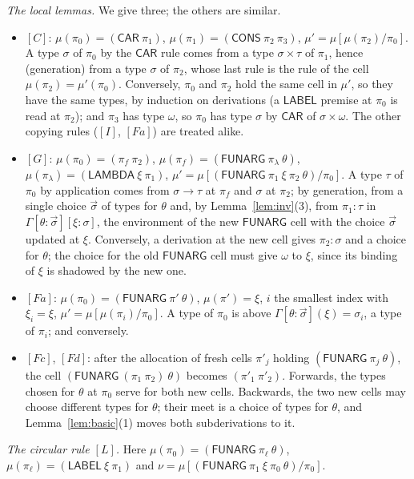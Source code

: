 \documentclass[11pt]{amsart}
\theoremstyle{definition}
\theoremstyle{remark}
\newcommand{\kw}[1]{\mathsf{#1}}
\begin{document}
\noindent\emph{The local lemmas.} We give three; the others are similar.
\begin{itemize}
\item $[C]$: $\mu(\pi_0)=(\kw{CAR}\ \pi_1)$, $\mu(\pi_1)=(\kw{CONS}\ \pi_2\ \pi_3)$,
$\mu'=\mu[\mu(\pi_2)/\pi_0]$. A type $\sigma$ of $\pi_0$ by the $\kw{CAR}$ rule
comes from a type $\sigma\times\tau$ of $\pi_1$, hence (generation) from a type
$\sigma$ of $\pi_2$, whose last rule is the rule of the cell $\mu(\pi_2)=\mu'(\pi_0)$.
Conversely, $\pi_0$ and $\pi_2$ hold the same cell in $\mu'$, so they have
the same types, by induction on derivations (a $\kw{LABEL}$ premise at
$\pi_0$ is read at $\pi_2$); and $\pi_3$ has type $\omega$, so $\pi_0$ has type
$\sigma$ by $\kw{CAR}$ of $\sigma\times\omega$. The other copying rules ($[I]$,
$[Fa]$) are treated alike.
\item $[G]$: $\mu(\pi_0)=(\pi_f\ \pi_2)$, $\mu(\pi_f)=(\kw{FUNARG}\ \pi_\lambda\ \theta)$,
$\mu(\pi_\lambda)=(\kw{LAMBDA}\ \xi\ \pi_1)$, $\mu'=\mu[(\kw{FUNARG}\ \pi_1\ \xi\ \pi_2\ \theta)/\pi_0]$.
A type $\tau$ of $\pi_0$ by application comes from $\sigma\to\tau$ at $\pi_f$ and
$\sigma$ at $\pi_2$; by generation, from a single choice $\vec\sigma$ of types
for $\theta$ and, by Lemma~\ref{lem:inv}(3), from $\pi_1:\tau$ in
$\Gamma[\theta:\vec\sigma][\xi:\sigma]$, the environment of the new
$\kw{FUNARG}$ cell with the choice $\vec\sigma$ updated at $\xi$. Conversely,
a derivation at the new cell gives $\pi_2:\sigma$ and a choice for $\theta$;
the choice for the old $\kw{FUNARG}$ cell must give $\omega$ to $\xi$, since
its binding of $\xi$ is shadowed by the new one.
\item $[Fa]$: $\mu(\pi_0)=(\kw{FUNARG}\ \pi'\ \theta)$, $\mu(\pi')=\xi$, $i$ the
smallest index with $\xi_i=\xi$, $\mu'=\mu[\mu(\pi_i)/\pi_0]$. A type of $\pi_0$
is above $\Gamma[\theta:\vec\sigma](\xi)=\sigma_i$, a type of $\pi_i$; and
conversely.
\item $[Fc]$, $[Fd]$: after the allocation of fresh cells $\pi'_j$ holding
$(\kw{FUNARG}\ \pi_j\ \theta)$, the cell $(\kw{FUNARG}\ (\pi_1\ \pi_2)\ \theta)$
becomes $(\pi'_1\ \pi'_2)$. Forwards, the types chosen for $\theta$ at $\pi_0$
serve for both new cells. Backwards, the two new cells may choose different
types for $\theta$; their meet is a choice of types for $\theta$, and
Lemma~\ref{lem:basic}(1) moves both subderivations to it.
\end{itemize}

\noindent\emph{The circular rule $[L]$.} Here
$\mu(\pi_0)=(\kw{FUNARG}\ \pi_\ell\ \theta)$, $\mu(\pi_\ell)=(\kw{LABEL}\ \xi\ \pi_1)$
and $\nu=\mu[(\kw{FUNARG}\ \pi_1\ \xi\ \pi_0\ \theta)/\pi_0]$.
\end{document}
